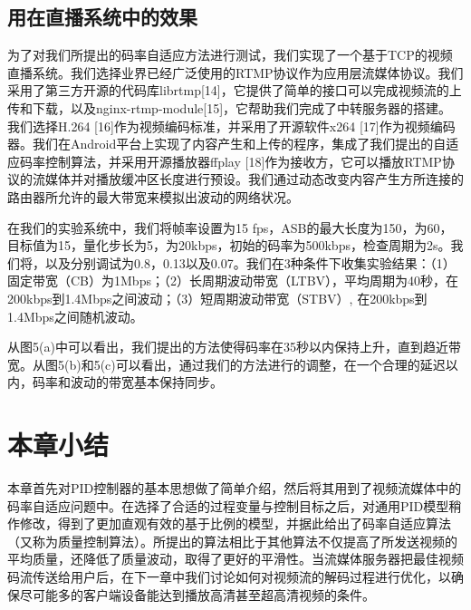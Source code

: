 \subsection{用在直播系统中的效果}

为了对我们所提出的码率自适应方法进行测试，我们实现了一个基于TCP的视频直播系统。我们选择业界已经广泛使用的RTMP协议作为应用层流媒体协议。我们采用了第三方开源的代码库librtmp[14]，它提供了简单的接口可以完成视频流的上传和下载，以及nginx-rtmp-module[15]，它帮助我们完成了中转服务器的搭建。我们选择H.264 [16]作为视频编码标准，并采用了开源软件x264 [17]作为视频编码器。我们在Android平台上实现了内容产生和上传的程序，集成了我们提出的自适应码率控制算法，并采用开源播放器ffplay [18]作为接收方，它可以播放RTMP协议的流媒体并对播放缓冲区长度进行预设。我们通过动态改变内容产生方所连接的路由器所允许的最大带宽来模拟出波动的网络状况。

在我们的实验系统中，我们将帧率设置为15 fps，ASB的最大长度为150，为60，目标值为15，量化步长为5，为20kbps，初始的码率为500kbps，检查周期为2s。我们将，以及分别调试为0.8，0.13以及0.07。我们在3种条件下收集实验结果：（1）固定带宽（CB）为1Mbps；（2）长周期波动带宽（LTBV），平均周期为40秒，在200kbps到1.4Mbps之间波动；（3）短周期波动带宽（STBV）, 在200kbps到1.4Mbps之间随机波动。

从图5(a)中可以看出，我们提出的方法使得码率在35秒以内保持上升，直到趋近带宽。从图5(b)和5(c)可以看出，通过我们的方法进行的调整，在一个合理的延迟以内，码率和波动的带宽基本保持同步。



\section{本章小结}

本章首先对PID控制器的基本思想做了简单介绍，然后将其用到了视频流媒体中的码率自适应问题中。在选择了合适的过程变量与控制目标之后，对通用PID模型稍作修改，得到了更加直观有效的基于比例的模型，并据此给出了码率自适应算法（又称为质量控制算法）。所提出的算法相比于其他算法不仅提高了所发送视频的平均质量，还降低了质量波动，取得了更好的平滑性。当流媒体服务器把最佳视频码流传送给用户后，在下一章中我们讨论如何对视频流的解码过程进行优化，以确保尽可能多的客户端设备能达到播放高清甚至超高清视频的条件。
